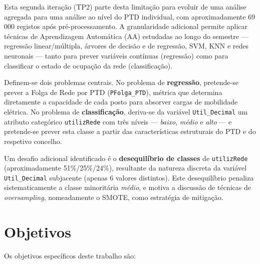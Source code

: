 \documentclass[conference]{IEEEtran}
\begin{document}
Esta segunda iteração (TP2) parte desta limitação para evoluir de uma análise agregada para uma análise ao nível do PTD individual, com aproximadamente 69\,000 registos após pré-processamento. A granularidade adicional permite aplicar técnicas de Aprendizagem Automática (AA) estudadas ao longo do semestre --- regressão linear/múltipla, árvores de decisão e de regressão, SVM, KNN e redes neuronais --- tanto para prever variáveis contínuas (regressão) como para classificar o estado de ocupação da rede (classificação).

Definem-se dois problemas centrais. No problema de \textbf{regressão}, pretende-se prever a Folga de Rede por PTD (\texttt{PFolga\_PTD}), métrica que determina diretamente a capacidade de cada posto para absorver cargas de mobilidade elétrica. No problema de \textbf{classificação}, deriva-se da variável \texttt{Util\_Decimal} um atributo categórico \texttt{utilizRede} com três níveis --- \emph{baixo}, \emph{médio} e \emph{alto} --- e pretende-se prever esta classe a partir das características estruturais do PTD e do respetivo concelho.

Um desafio adicional identificado é o \textbf{desequilíbrio de classes} de \texttt{utilizRede} (aproximadamente 51\%/25\%/24\%), resultante da natureza discreta da variável \texttt{Util\_Decimal} subjacente (apenas 6 valores distintos). Este desequilíbrio penaliza sistematicamente a classe minoritária \emph{médio}, e motiva a discussão de técnicas de \textit{oversampling}, nomeadamente o SMOTE, como estratégia de mitigação.

\section{Objetivos}

Os objetivos específicos deste trabalho são:
\end{document}
